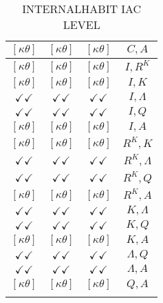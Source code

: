 \documentclass[a4paper,10pt]{article}
\begin{document}
\begin{longtable}{|c|c|c|c|}
\hline
$[\kappa \theta ]$ & $[\kappa \theta ]$ & $[\kappa \theta ]$ & ${C},{A}$ \\
\hline
$[\kappa \theta ]$ & $[\kappa \theta ]$ & $[\kappa \theta ]$ & ${I},{R^{K}}$ \\
\hline
$[\kappa \theta ]$ & $[\kappa \theta ]$ & $[\kappa \theta ]$ & ${I},{K}$ \\
\hline
$\checkmark\checkmark$ & $\checkmark\checkmark$ & $\checkmark\checkmark$ & ${I},{\Lambda}$ \\
\hline
$\checkmark\checkmark$ & $\checkmark\checkmark$ & $\checkmark\checkmark$ & ${I},{Q}$ \\
\hline
$[\kappa \theta ]$ & $[\kappa \theta ]$ & $[\kappa \theta ]$ & ${I},{A}$ \\
\hline
$[\kappa \theta ]$ & $[\kappa \theta ]$ & $[\kappa \theta ]$ & ${R^{K}},{K}$ \\
\hline
$\checkmark\checkmark$ & $\checkmark\checkmark$ & $\checkmark\checkmark$ & ${R^{K}},{\Lambda}$ \\
\hline
$\checkmark\checkmark$ & $\checkmark\checkmark$ & $\checkmark\checkmark$ & ${R^{K}},{Q}$ \\
\hline
$[\kappa \theta ]$ & $[\kappa \theta ]$ & $[\kappa \theta ]$ & ${R^{K}},{A}$ \\
\hline
$\checkmark\checkmark$ & $\checkmark\checkmark$ & $\checkmark\checkmark$ & ${K},{\Lambda}$ \\
\hline
$\checkmark\checkmark$ & $\checkmark\checkmark$ & $\checkmark\checkmark$ & ${K},{Q}$ \\
\hline
$[\kappa \theta ]$ & $[\kappa \theta ]$ & $[\kappa \theta ]$ & ${K},{A}$ \\
\hline
$\checkmark\checkmark$ & $\checkmark\checkmark$ & $\checkmark\checkmark$ & ${\Lambda},{Q}$ \\
\hline
$\checkmark\checkmark$ & $\checkmark\checkmark$ & $\checkmark\checkmark$ & ${\Lambda},{A}$ \\
\hline
$[\kappa \theta ]$ & $[\kappa \theta ]$ & $[\kappa \theta ]$ & ${Q},{A}$ \\
\hline
\caption{INTERNALHABIT IAC LEVEL}
\label{table:MyTableLabel}
\end{longtable}
\end{document}
